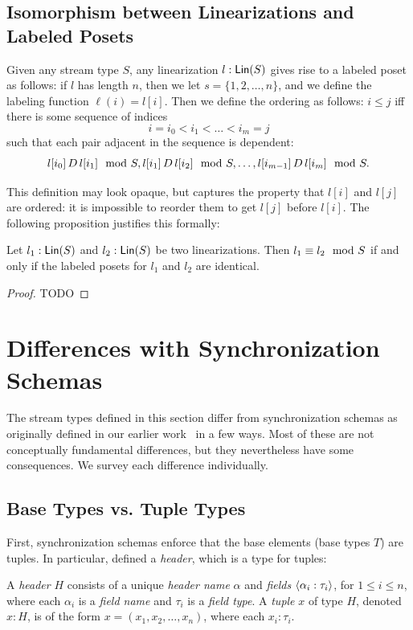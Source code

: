 \subsection{Isomorphism between Linearizations and Labeled Posets}

Given any stream type $S$, any linearization $l: \mathsf{Lin}({S})$ gives rise to a labeled poset as follows:
if $l$ has length $n$, then we let $s = \{1, 2, \ldots, n\}$, and we define the labeling function $\ell(i) = l[i]$.
Then we define the ordering as follows:
$i \le j$ iff there is some sequence of indices
\[
i = i_0 < i_1 < \ldots < i_m = j
\]
such that each pair adjacent in the sequence is dependent:
\[
l[i_0] \,D\, l[i_1] \mod {S}, l[i_1] \,D\, l[i_2] \mod {S}, \ldots, l[i_{m-1}] \,D\, l[i_m] \mod {S}.
\]

This definition may look opaque, but captures the property that $l[i]$ and $l[j]$ are ordered: it is impossible to reorder them to get $l[j]$ before $l[i]$. The following proposition justifies this formally:
\begin{proposition}
\label{prop:lin-poset-correspondence}
Let $l_1: \mathsf{Lin}({S})$ and $l_2: \mathsf{Lin}({S})$ be two linearizations.
Then $l_1 \equiv l_2 \mod {S}$ if and only if the labeled posets for $l_1$
and $l_2$ are identical.
\end{proposition}
\begin{proof}
  TODO
\end{proof}

\section{Differences with Synchronization Schemas}

The stream types defined in this section differ from synchronization schemas as originally defined in our earlier work~
in a few ways. Most of these are not conceptually fundamental differences, but they nevertheless have some consequences. We survey each difference individually.

\subsection{Base Types vs. Tuple Types}

First, synchronization schemas enforce that the base elements (base types $T$) are tuples.
In particular,  defined a \emph{header}, which is a type for tuples:
\begin{definition}
A \emph{header} $H$
consists of a unique \emph{header name} \(\alpha\)
and \emph{fields} \(\left\langle\alpha_i: \tau_i\right\rangle\), for $1\le i\le n$,
where each \(\alpha_i\) is a \emph{field name}
and \(\tau_i\) is a \emph{field type}.
A \emph{tuple} $x$ of type \(H\), denoted $x : H$, is of the form
\(x = (x_1, x_2, \ldots, x_n)\), where each \(x_i : \tau_i\).
\end{definition}

